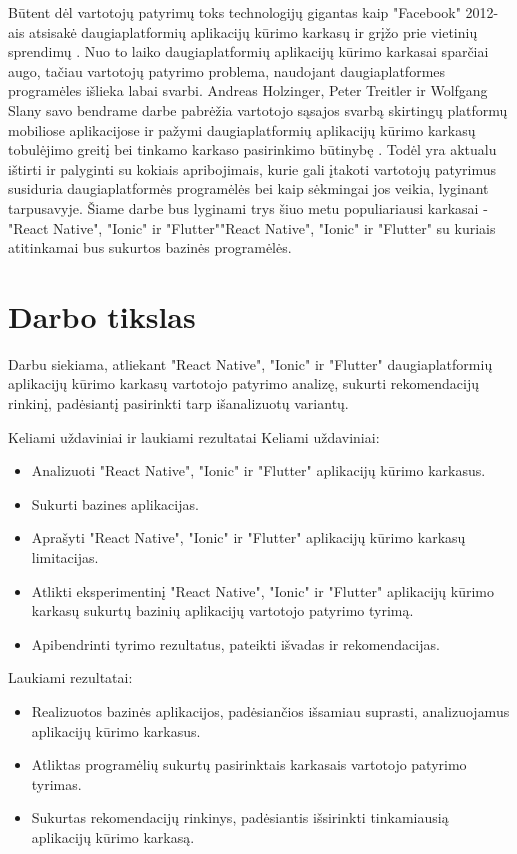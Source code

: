 \documentclass{VUMIFInfBakalaurinis}
\begin{document}
Būtent dėl vartotojų patyrimų toks technologijų gigantas kaip "Facebook" 2012-ais atsisakė daugiaplatformių aplikacijų kūrimo karkasų ir grįžo prie vietinių sprendimų \cite{facebook}. Nuo to laiko daugiaplatformių aplikacijų kūrimo karkasai sparčiai augo, tačiau vartotojų patyrimo problema, naudojant daugiaplatformes programėles išlieka labai svarbi. Andreas Holzinger, Peter Treitler ir Wolfgang Slany savo bendrame darbe pabrėžia vartotojo sąsajos svarbą skirtingų platformų mobiliose aplikacijose ir pažymi daugiaplatformių aplikacijų kūrimo karkasų tobulėjimo greitį bei tinkamo karkaso pasirinkimo būtinybę \cite{usable}. Todėl yra aktualu ištirti ir palyginti su kokiais apribojimais, kurie gali įtakoti vartotojų patyrimus susiduria daugiaplatformės programėlės bei kaip sėkmingai jos veikia, lyginant tarpusavyje. Šiame darbe bus lyginami trys šiuo metu populiariausi karkasai - "React Native", "Ionic" ir "Flutter""React Native", "Ionic" ir "Flutter" \cite{popularframeworks} su kuriais atitinkamai bus sukurtos bazinės programėlės.

\section{Darbo tikslas}
Darbu siekiama, atliekant "React Native", "Ionic" ir "Flutter" daugiaplatformių aplikacijų kūrimo karkasų vartotojo patyrimo analizę, sukurti rekomendacijų rinkinį, padėsiantį pasirinkti tarp išanalizuotų variantų.

\begin {section}{Keliami uždaviniai ir laukiami rezultatai}
Keliami uždaviniai:
\begin{itemize}
  \item Analizuoti "React Native", "Ionic" ir "Flutter" aplikacijų kūrimo karkasus.
  \item Sukurti bazines aplikacijas.
  \item Aprašyti "React Native", "Ionic" ir "Flutter" aplikacijų kūrimo karkasų limitacijas.
  \item Atlikti eksperimentinį "React Native", "Ionic" ir "Flutter" aplikacijų kūrimo karkasų sukurtų bazinių aplikacijų vartotojo patyrimo tyrimą.
  \item Apibendrinti tyrimo rezultatus, pateikti išvadas ir rekomendacijas.
\end{itemize}

Laukiami rezultatai:
\begin{itemize}
  \item Realizuotos bazinės aplikacijos, padėsiančios išsamiau suprasti, analizuojamus aplikacijų kūrimo karkasus.
  \item Atliktas programėlių sukurtų pasirinktais karkasais vartotojo patyrimo tyrimas.
  \item Sukurtas rekomendacijų rinkinys, padėsiantis išsirinkti tinkamiausią aplikacijų kūrimo karkasą.
\end{itemize}

\end{section}
\end{document}
